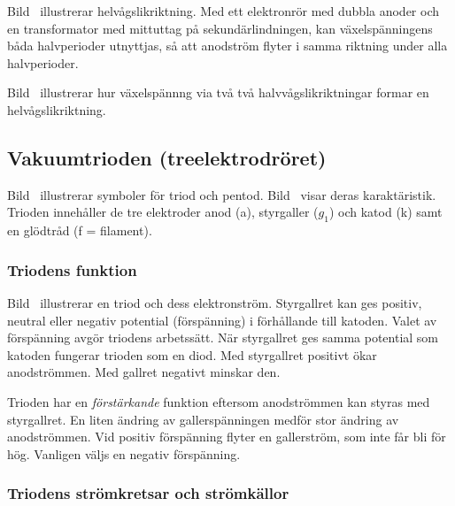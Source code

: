 Bild~ illustrerar helvågslikriktning.
Med ett elektronrör med dubbla anoder och en transformator med mittuttag på
sekundärlindningen, kan växelspänningens båda halvperioder utnyttjas, så att
anodström flyter i samma riktning under alla halvperioder.


Bild~ illustrerar hur växelspännng via två två
halvvågslikriktningar formar en helvågslikriktning.

\subsection{Vakuumtrioden (treelektrodröret)}

Bild~ illustrerar symboler för triod och pentod.
Bild~ visar deras karaktäristik.
Trioden innehåller de tre elektroder anod (a), styrgaller (\(g_1\)) och katod
(k) samt en glödtråd (f = filament).

\newpage
{}



\subsubsection{Triodens funktion}

Bild~ illustrerar en triod och dess elektronström.
Styrgallret kan ges positiv, neutral eller negativ potential (förspänning) i
förhållande till katoden.
Valet av förspänning avgör triodens arbetssätt.
När styrgallret ges samma potential som katoden fungerar trioden som en diod.
Med styrgallret positivt ökar anodströmmen.
Med gallret negativt minskar den.

Trioden har en \emph{förstärkande} funktion eftersom anodströmmen kan styras med
styrgallret.
En liten ändring av gallerspänningen medför stor ändring av anodströmmen.
Vid positiv förspänning flyter en gallerström, som inte får bli för hög.
Vanligen väljs en negativ förspänning.

\subsubsection{Triodens strömkretsar och strömkällor}

